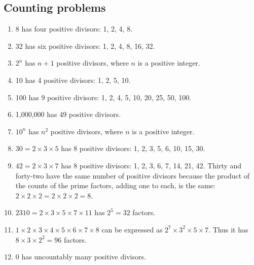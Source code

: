 \documentclass[12pt]{article}
\begin{document}
\subsection{Counting problems}
\begin{enumerate}
    \item 8 has four positive divisors: 1, 2, 4, 8.
    \item 32 has six positive divisors: 1, 2, 4, 8, 16, 32.
    \item$2^n$ has $n+1$ positive divisors, where $n$ is a positive integer.
    \item 10 has 4 positive divisors: 1, 2, 5, 10.
    \item 100 has 9 positive divisors: 1, 2, 4, 5, 10, 20, 25, 50, 100.
    \item 1,000,000 has 49 positive divisors.
    \item$10^n$ has $n^2$ positive divisors, where $n$ is a positive integer.
    \item$30=2\times 3\times 5$ has 8 positive divisors: 1, 2, 3, 5, 6, 10, 15, 30.
    \item$42=2\times 3\times 7$ has 8 positive divisors: 1, 2, 3, 6, 7, 14, 21, 42. Thirty and forty-two have the same number of positive divisors because the product of the counts of the prime factors, adding one to each, is the same: $2\times 2\times 2 = 2\times 2\times 2 = 8$.
    \item$2310=2\times 3\times 5\times 7\times 11$ has $2^5=32$ factors.
    \item$1\times 2\times 3\times 4\times 5\times 6\times 7\times 8$ can be expressed as $2^7\times 3^2\times 5\times 7$. Thus it has $8\times 3\times 2^2=96$ factors.
    \item 0 has uncountably many positive divisors.
\end{enumerate}
\end{document}
